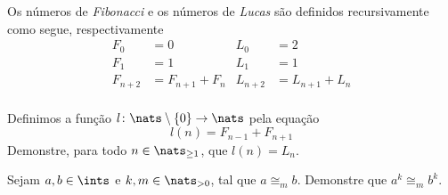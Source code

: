 \begin{definition}
    Os n\'umeros de {\em Fibonacci} e os n\'umeros de {\em Lucas} s\~ao
    definidos recursivamente como segue, respectivamente
    \begin{align*}
        F_0     &= 0             & L_0     &= 2 \\
        F_1     &= 1             & L_1     &= 1 \\
        F_{n+2} &= F_{n+1} + F_n & L_{n+2} &= L_{n+1} + L_n \\
    \end{align*}
\end{definition}

\begin{exercise}
    Definimos a fun{\c c}\~ao $l \colon \nats \setminus \{0\} \to \nats$ pela
    equa{\c c}\~ao
    $$
    l(n)=F_{n-1}+F_{n+1}
    $$
    Demonstre, para todo $n \in \nats_{\geq 1}$, que $l(n)=L_n$.
\end{exercise}

\begin{exercise}
    Sejam $a,b \in \ints$ e $k,m \in \nats_{>0}$, tal que $a \cong_m b$.
    Demonstre que $a^k \cong_m b^k$.
\end{exercise}
